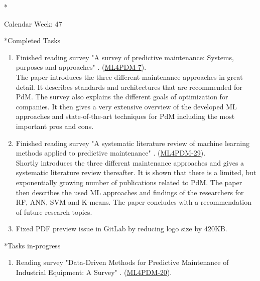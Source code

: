 \documentclass[11pt,a4paper]{article}
\begin{document}
\newpage
\begin{section}*{Calendar Week: 47 \hfill \date{20 November, 2020}}
 \begin{refsection}

   \begin{subsection}*{Completed Tasks}
     \begin{enumerate}
       \item
             Finished reading survey "A survey of predictive maintenance: Systems, purposes and approaches" \cite{DBLP:journals/corr/abs-1912-07383}. (\href{https://ml4pdm.atlassian.net/browse/ML4PDM-7}{ML4PDM-7}).\\
             \phantom\quad The paper introduces the three different maintenance approaches in great detail. It describes standards and architectures that are recommended for PdM. The survey also explains the different goals of optimization for companies. It then gives a very extensive overview of the developed ML approaches and state-of-the-art techniques for PdM including the most important pros and cons.
       \item
             Finished reading survey "A systematic literature review of machine learning methods applied to predictive maintenance" \cite{DBLP:journals/candie/CarvalhoSVFBA19}. (\href{https://ml4pdm.atlassian.net/browse/ML4PDM-29}{ML4PDM-29}).\\
             \phantom\quad Shortly introduces the three different maintenance approaches and gives a systematic literature review thereafter. It is shown that there is a limited, but exponentially growing number of publications related to PdM. The paper then describes the used ML approaches and findings of the researchers for RF, ANN, SVM and K-means. The paper concludes with a recommendation of future research topics.
       \item
             Fixed PDF preview issue in GitLab by reducing logo size by 420KB.
     \end{enumerate}
   \end{subsection}

   \begin{subsection}*{Tasks in-progress}
     \begin{enumerate}
       \item
             Reading survey "Data-Driven Methods for Predictive Maintenance of Industrial Equipment: A Survey" \cite{DBLP:journals/sj/ZhangYW19}. (\href{https://ml4pdm.atlassian.net/browse/ML4PDM-20}{ML4PDM-20}).
     \end{enumerate}
   \end{subsection}

   \printbibliography
 \end{refsection}
\end{section}
\end{document}
